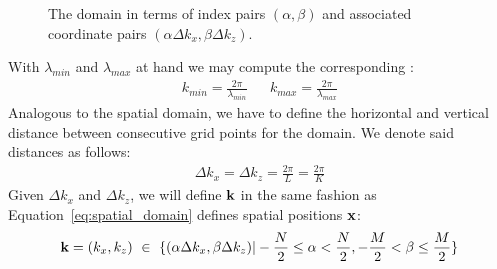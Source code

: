 \begin{figure}
\centering
\caption{The \wavevector domain in terms of index pairs $(\alpha,\beta)$ and
associated coordinate pairs $(\alpha\Delta k_x,\beta\Delta k_z)$.}
\label{fig:wave_vector_domain}
\end{figure}
%
With $\lambda_{min}$ and $\lambda_{max}$ at hand we may compute the
corresponding \wavenumbers:
\begin{align}
\label{eq:kmin_kmax}
 k_{min} = \frac{2\pi}{\lambda_{min}} && k_{max} = \frac{2\pi}{\lambda_{max}}
\end{align}
%
Analogous to the spatial domain, we have to define the horizontal and vertical 
distance between consecutive grid points for the \wavevector domain. We denote 
said distances as follows:
\begin{align}
\label{eq:delta_kx_delta_ky}
 \Delta k_x = \Delta k_z = \frac{2\pi}{L} = \frac{2\pi}{K}
\end{align}
%
Given $\Delta k_x$ and $\Delta k_z$, we will define \wavevectors $\mathbf{k}$ in 
the same fashion as Equation~\ref{eq:spatial_domain} defines spatial positions 
$\mathbf{x}$:
\begin{equation}
\label{eq:wave_vector_domain}
 \mathbf{k} = (k_x,k_z)~\in~\{(\alpha\Delta k_x,\beta\Delta k_z)|
-\frac{N}{2}\leq\alpha<\frac{N}{2},-\frac{M}{2}<\beta\leq\frac{M}{2}\}
\end{equation}
